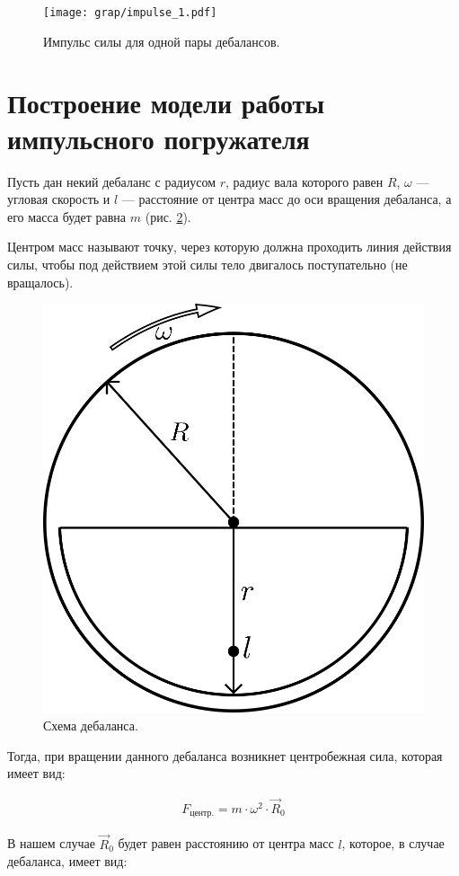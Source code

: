 \begin{figure}[h]
    \centering
    \texttt{[image: grap/impulse\_1.pdf]}
    \caption{Импульс силы для одной пары дебалансов.}
    \label{grap:impulse_1}
\end{figure}


\clearpage
\section{Построение модели работы импульсного погружателя}
\label{chapter:model}

Пусть дан некий дебаланс с радиусом $r$, радиус вала которого равен $R$,
$\omega$ --- угловая скорость и $l$ --- расстояние от центра масс до оси вращения дебаланса, а его масса будет равна $m$ (рис. \ref{fig:debalance}). 

\begin{definition}
    Центром масс называют точку, через которую должна проходить линия действия силы, чтобы под действием этой силы тело двигалось поступательно (не вращалось).
\end{definition}

\begin{figure}[h]
    \centering
    \includegraphics[width=0.4\linewidth]{img/debalance.png}
    \caption{Схема дебаланса.}
    \label{fig:debalance}
\end{figure}

Тогда, при вращении данного дебаланса возникнет центробежная сила, которая имеет вид:

\begin{equation}\label{eq:centrifugal}
    \begin{gathered}
        F_{\textrm{центр.}} = m \cdot \omega^2 \cdot \vec{R}_0
    \end{gathered}
\end{equation}

В нашем случае $\vec{R}_0$ будет равен расстоянию от центра масс $l$, которое, в случае дебаланса, имеет вид:


